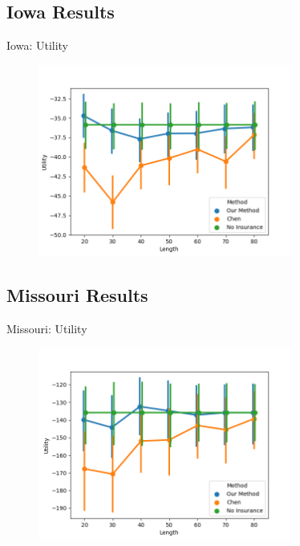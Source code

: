 \documentclass{beamer}
\begin{document}

\subsection*{Iowa Results}
\begin{frame}{Iowa: Utility}
    \begin{figure}
        \includegraphics[width=0.75\textwidth]{../../../output/figures/Evaluation/Iowa_Average_Utility_CI.png}
    \end{figure}
\end{frame}


\subsection*{Missouri Results}
\begin{frame}{Missouri: Utility}
    \begin{figure}
        \includegraphics[width=0.75\textwidth]{../../../output/figures/Evaluation/Missouri_Average_Utility_CI.png}
    \end{figure}
\end{frame}
\end{document}
